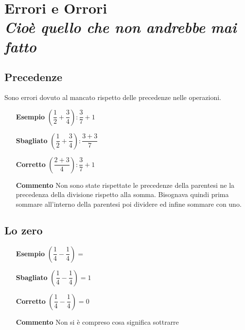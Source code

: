 \chapter[Errori ed orrori]
{Errori e Orrori\\[.5ex]
	\normalsize\textit{Cioè quello che non andrebbe mai fatto}}
	\label{cha:orrorieerroriraz}

	\section{Precedenze}
	\label{sec:precedenze}
	Sono errori dovuto al  mancato rispetto delle precedenze nelle operazioni.
	
	\begin{itemize}
		\item [\textbf{Esempio}]$(\dfrac{1}{2 }+\dfrac{3}{4}):\dfrac{3}{7}+1$
		\item [\textbf{Sbagliato}]$(\dfrac{1}{2 }+\dfrac{3}{4}):\dfrac{3+3}{7}$
		\item [\textbf{Corretto}]$(\dfrac{2+3}{4}):\dfrac{3}{7}+1$
		\item [\textbf{Commento}]Non sono state rispettate le precedenze della parentesi ne la precedenza della divisione rispetto alla somma. Bisognava quindi prima sommare all'interno della parentesi poi dividere ed infine sommare con uno.
	\end{itemize}
	\section{Lo zero}
	\label{sec:lozero}
	\begin{itemize}
		\item [\textbf{Esempio}]$(\dfrac{1}{4 }-\dfrac{1}{4})=$
		\item [\textbf{Sbagliato}]$(\dfrac{1}{4 }-\dfrac{1}{4})=1$
		\item [\textbf{Corretto}]$(\dfrac{1}{4 }-\dfrac{1}{4})=0$
		\item [\textbf{Commento}] Non si è compreso cosa significa sottrarre 
	\end{itemize}